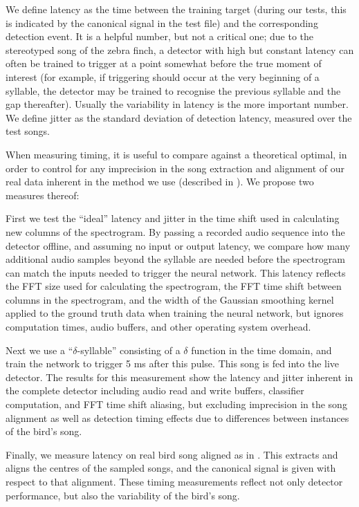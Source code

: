 \documentclass[10pt,letterpaper]{article}
\begin{document}
We define latency as the time between the training target (during our tests, this is indicated by the canonical
signal in the test file) and the corresponding detection event.  It is a helpful number,
but not a critical one; due to the stereotyped song of the zebra finch, a detector with high but
constant latency can often be trained to trigger at a point somewhat
before the true moment of interest (for example, if triggering should
occur at the very beginning of a syllable, the detector may be trained 
to recognise the previous syllable and the gap thereafter).  Usually the 
variability in latency is the more important number.  We define jitter as 
the standard deviation of detection latency, measured over the test songs.

When measuring timing, it is useful to compare against a theoretical
optimal, in order to control for any imprecision in the song
extraction and alignment of our real data inherent in the method we
use (described in \cite{Poole2012}).  We propose two measures thereof:

First we test the ``ideal'' latency and jitter in the time shift used
in calculating new columns of the spectrogram. By passing a recorded
audio sequence into the detector offline, and assuming no input or
output latency, we compare how many additional audio samples beyond
the syllable are needed before the spectrogram can match the inputs
needed to trigger the neural network.  This latency reflects the FFT
size used for calculating the spectrogram, the FFT time shift between
columns in the spectrogram, and the width of the Gaussian smoothing
kernel applied to the ground truth data when training the neural
network, but ignores computation times, audio buffers, and other
operating system overhead.

Next we use a ``$\delta$-syllable'' consisting of a $\delta$ function
in the time domain, and train the network to trigger 5 ms after this
pulse.  This song is fed into the live detector.  The results for this
measurement show the latency and jitter inherent in the complete
detector including audio read and write buffers, classifier
computation, and FFT time shift aliasing, but excluding imprecision in
the song alignment as well as detection timing effects due to
differences between instances of the bird's song.

Finally, we measure latency on real bird song aligned as in
\cite{Poole2012}.  This extracts and aligns the centres of the sampled
songs, and the canonical signal is given with respect to that
alignment.  These timing measurements reflect not only detector
performance, but also the variability of the bird's song.
\end{document}
